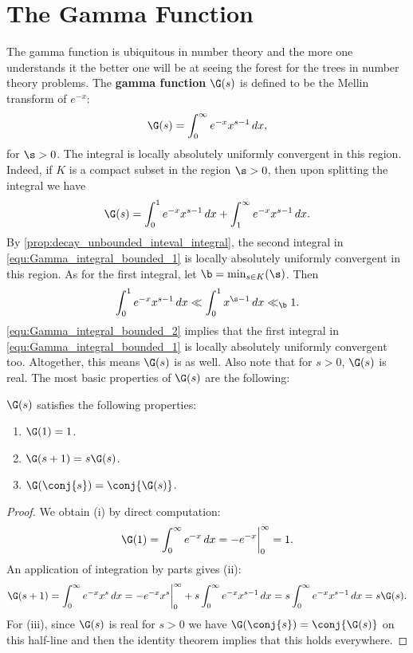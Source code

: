     \section{The Gamma Function}
      The gamma function is ubiquitous in number theory and the more one understands it the better one will be at seeing the forest for the trees in number theory problems. The \textbf{gamma function} $\G(s)$ is defined to be the Mellin transform of $e^{-x}$:
      \[
        \G(s) = \int_{0}^{\infty}e^{-x}x^{s-1}\,dx,
      \]
      for $\s > 0$. The integral is locally absolutely uniformly convergent in this region. Indeed, if $K$ is a compact subset in the region $\s > 0$, then upon splitting the integral we have
      \begin{equation}\label{equ:Gamma_integral_bounded_1}
        \G(s) = \int_{0}^{1}e^{-x}x^{s-1}\,dx+\int_{1}^{\infty}e^{-x}x^{s-1}\,dx.
      \end{equation}
      By \cref{prop:decay_unbounded_inteval_integral}, the second integral in \cref{equ:Gamma_integral_bounded_1} is locally absolutely uniformly convergent in this region. As for the first integral, let $\b = \min_{s \in K}(\s)$. Then
      \begin{equation}\label{equ:Gamma_integral_bounded_2}
        \int_{0}^{1}e^{-x}x^{s-1}\,dx \ll \int_{0}^{1}x^{\s-1}\,dx \ll_{\b} 1.
      \end{equation}
      \cref{equ:Gamma_integral_bounded_2} implies that the first integral in \cref{equ:Gamma_integral_bounded_1} is locally absolutely uniformly convergent too. Altogether, this means $\G(s)$ is as well. Also note that for $s >0$, $\G(s)$ is real. The most basic properties of $\G(s)$ are the following:

      \begin{proposition}\label{prop:Factorial_properties_of_gamma_function}
        $\G(s)$ satisfies the following properties:
        \begin{enumerate}[label=(\roman*)]
          \item $\G(1) = 1$.
          \item $\G(s+1) = s\G(s)$.
          \item $\G(\conj{s}) = \conj{\G(s)}$.
        \end{enumerate}
      \end{proposition}
      \begin{proof}
        We obtain (i) by direct computation:
        \[
          \G(1) = \int_{0}^{\infty}e^{-x}\,dx = -e^{-x}\bigg|_{0}^{\infty} = 1.
        \]
        An application of integration by parts gives (ii):
        \[
          \G(s+1) = \int_{0}^{\infty}e^{-x}x^{s}\,dx = -e^{-x}x^{s}\bigg|_{0}^{\infty}+s\int_{0}^{\infty}e^{-x}x^{s-1}\,dx = s\int_{0}^{\infty}e^{-x}x^{s-1}\,dx = s\G(s).
        \]
        For (iii), since $\G(s)$ is real for $s >0$ we have $\G(\conj{s}) = \conj{\G(s)}$ on this half-line and then the identity theorem implies that this holds everywhere.
      \end{proof}

